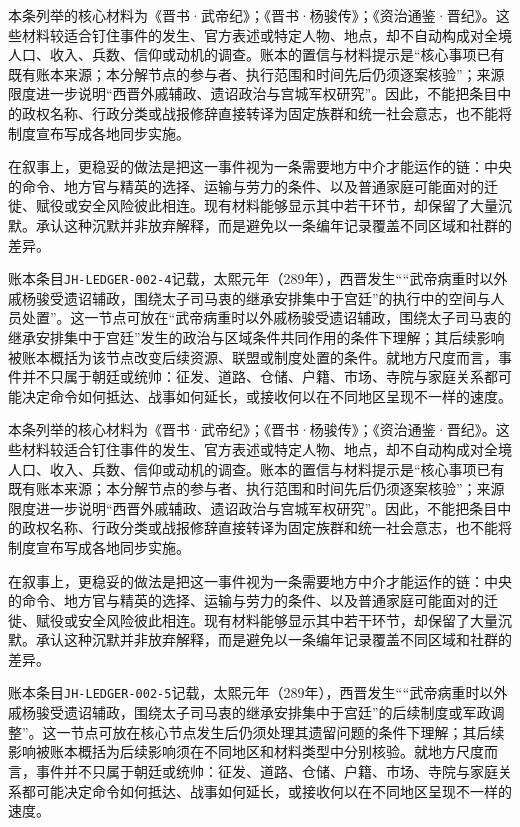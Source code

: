 本条列举的核心材料为《晋书·武帝纪》；《晋书·杨骏传》；《资治通鉴·晋纪》。这些材料较适合钉住事件的发生、官方表述或特定人物、地点，却不自动构成对全境人口、收入、兵数、信仰或动机的调查。账本的置信与材料提示是“核心事项已有既有账本来源；本分解节点的参与者、执行范围和时间先后仍须逐案核验”；来源限度进一步说明“西晋外戚辅政、遗诏政治与宫城军权研究”。因此，不能把条目中的政权名称、行政分类或战报修辞直接转译为固定族群和统一社会意志，也不能将制度宣布写成各地同步实施。

在叙事上，更稳妥的做法是把这一事件视为一条需要地方中介才能运作的链：中央的命令、地方官与精英的选择、运输与劳力的条件、以及普通家庭可能面对的迁徙、赋役或安全风险彼此相连。现有材料能够显示其中若干环节，却保留了大量沉默。承认这种沉默并非放弃解释，而是避免以一条编年记录覆盖不同区域和社群的差异。

账本条目\texttt{JH-LEDGER-002-4}记载，太熙元年（289年），西晋发生““武帝病重时以外戚杨骏受遗诏辅政，围绕太子司马衷的继承安排集中于宫廷”的执行中的空间与人员处置”。这一节点可放在“武帝病重时以外戚杨骏受遗诏辅政，围绕太子司马衷的继承安排集中于宫廷”发生的政治与区域条件共同作用的条件下理解；其后续影响被账本概括为该节点改变后续资源、联盟或制度处置的条件。就地方尺度而言，事件并不只属于朝廷或统帅：征发、道路、仓储、户籍、市场、寺院与家庭关系都可能决定命令如何抵达、战事如何延长，或接收何以在不同地区呈现不一样的速度。

本条列举的核心材料为《晋书·武帝纪》；《晋书·杨骏传》；《资治通鉴·晋纪》。这些材料较适合钉住事件的发生、官方表述或特定人物、地点，却不自动构成对全境人口、收入、兵数、信仰或动机的调查。账本的置信与材料提示是“核心事项已有既有账本来源；本分解节点的参与者、执行范围和时间先后仍须逐案核验”；来源限度进一步说明“西晋外戚辅政、遗诏政治与宫城军权研究”。因此，不能把条目中的政权名称、行政分类或战报修辞直接转译为固定族群和统一社会意志，也不能将制度宣布写成各地同步实施。

在叙事上，更稳妥的做法是把这一事件视为一条需要地方中介才能运作的链：中央的命令、地方官与精英的选择、运输与劳力的条件、以及普通家庭可能面对的迁徙、赋役或安全风险彼此相连。现有材料能够显示其中若干环节，却保留了大量沉默。承认这种沉默并非放弃解释，而是避免以一条编年记录覆盖不同区域和社群的差异。

账本条目\texttt{JH-LEDGER-002-5}记载，太熙元年（289年），西晋发生““武帝病重时以外戚杨骏受遗诏辅政，围绕太子司马衷的继承安排集中于宫廷”的后续制度或军政调整”。这一节点可放在核心节点发生后仍须处理其遗留问题的条件下理解；其后续影响被账本概括为后续影响须在不同地区和材料类型中分别核验。就地方尺度而言，事件并不只属于朝廷或统帅：征发、道路、仓储、户籍、市场、寺院与家庭关系都可能决定命令如何抵达、战事如何延长，或接收何以在不同地区呈现不一样的速度。

